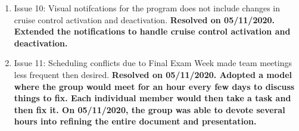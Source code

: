 \documentclass[preprint,11pt,3p]{article}
\begin{document}
\begin{enumerate}
	\item Issue 10: Visual notifcations for the program does not include changes in cruise control activation and deactivation. \textbf{Resolved on 05/11/2020. Extended the notifications to handle cruise control activation and deactivation.}
	\item Issue 11: Scheduling conflicts due to Final Exam Week made team meetings less frequent then desired. \textbf{Resolved on 05/11/2020. Adopted a model where the group would meet for an hour every few days to discuss things to fix. Each individual member would then take a task and then fix it. On 05/11/2020, the group was able to devote several hours into refining the entire document and presentation.}



\end{enumerate}
\end{document}
